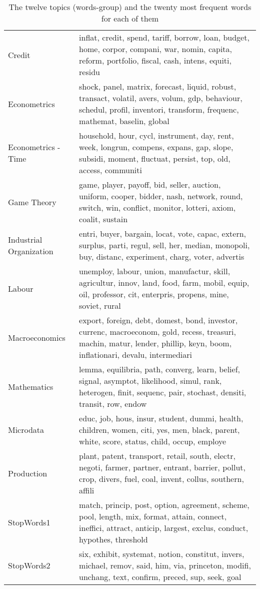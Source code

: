 \begin{table}[tb]
\centering
\caption[Topics]{The twelve topics (words-group) and the twenty most frequent words for each of them}
\label{tab:topics}
\begin{tabularx}{\hsize}{lY}
\toprule
                 Credit &                     inflat, credit, spend, tariff, borrow, loan, budget, home, corpor, compani, war, nomin, capita, reform, portfolio, fiscal, cash, intens, equiti, residu \\
           Econometrics & shock, panel, matrix, forecast, liquid, robust, transact, volatil, avers, volum, gdp, behaviour, schedul, profil, inventori, transform, frequenc, mathemat, baselin, global \\
    Econometrics - Time &                   household, hour, cycl, instrument, day, rent, week, longrun, compens, expans, gap, slope, subsidi, moment, fluctuat, persist, top, old, access, communiti \\
            Game Theory &                  game, player, payoff, bid, seller, auction, uniform, cooper, bidder, nash, network, round, switch, win, conflict, monitor, lotteri, axiom, coalit, sustain \\
Industrial Organization &                     entri, buyer, bargain, locat, vote, capac, extern, surplus, parti, regul, sell, her, median, monopoli, buy, distanc, experiment, charg, voter, advertis \\
                 Labour &                 unemploy, labour, union, manufactur, skill, agricultur, innov, land, food, farm, mobil, equip, oil, professor, cit, enterpris, propens, mine, soviet, rural \\
         Macroeconomics & export, foreign, debt, domest, bond, investor, currenc, macroeconom, gold, recess, treasuri, machin, matur, lender, phillip, keyn, boom, inflationari, devalu, intermediari \\
            Mathematics &         lemma, equilibria, path, converg, learn, belief, signal, asymptot, likelihood, simul, rank, heterogen, finit, sequenc, pair, stochast, densiti, transit, row, endow \\
              Microdata &                                 educ, job, hous, insur, student, dummi, health, children, women, citi, yes, men, black, parent, white, score, status, child, occup, employe \\
             Production &              plant, patent, transport, retail, south, electr, negoti, farmer, partner, entrant, barrier, pollut, crop, divers, fuel, coal, invent, collus, southern, affili \\
             StopWords1 &      match, princip, post, option, agreement, scheme, pool, length, mix, format, attain, connect, ineffici, attract, anticip, largest, exclus, conduct, hypothes, threshold \\
             StopWords2 &                       six, exhibit, systemat, notion, constitut, invers, michael, remov, said, him, via, princeton, modifi, unchang, text, confirm, preced, sup, seek, goal \\
\bottomrule
\end{tabularx}
\end{table}
